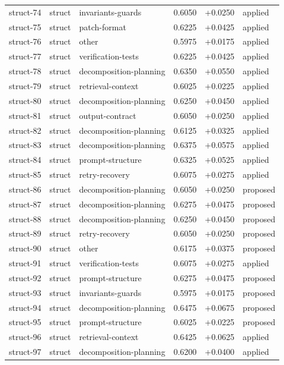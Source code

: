 \begin{center}
\begin{longtable}{llp{5.2cm}rrl}
struct-74 & struct & invariants-guards & 0.6050 & +0.0250 & applied \\
struct-75 & struct & patch-format & 0.6225 & +0.0425 & applied \\
struct-76 & struct & other & 0.5975 & +0.0175 & applied \\
struct-77 & struct & verification-tests & 0.6225 & +0.0425 & applied \\
struct-78 & struct & decomposition-planning & 0.6350 & +0.0550 & applied \\
struct-79 & struct & retrieval-context & 0.6025 & +0.0225 & applied \\
struct-80 & struct & decomposition-planning & 0.6250 & +0.0450 & applied \\
struct-81 & struct & output-contract & 0.6050 & +0.0250 & applied \\
struct-82 & struct & decomposition-planning & 0.6125 & +0.0325 & applied \\
struct-83 & struct & decomposition-planning & 0.6375 & +0.0575 & applied \\
struct-84 & struct & prompt-structure & 0.6325 & +0.0525 & applied \\
struct-85 & struct & retry-recovery & 0.6075 & +0.0275 & applied \\
struct-86 & struct & decomposition-planning & 0.6050 & +0.0250 & proposed \\
struct-87 & struct & decomposition-planning & 0.6275 & +0.0475 & proposed \\
struct-88 & struct & decomposition-planning & 0.6250 & +0.0450 & proposed \\
struct-89 & struct & retry-recovery & 0.6050 & +0.0250 & proposed \\
struct-90 & struct & other & 0.6175 & +0.0375 & proposed \\
struct-91 & struct & verification-tests & 0.6075 & +0.0275 & applied \\
struct-92 & struct & prompt-structure & 0.6275 & +0.0475 & proposed \\
struct-93 & struct & invariants-guards & 0.5975 & +0.0175 & proposed \\
struct-94 & struct & decomposition-planning & 0.6475 & +0.0675 & proposed \\
struct-95 & struct & prompt-structure & 0.6025 & +0.0225 & proposed \\
struct-96 & struct & retrieval-context & 0.6425 & +0.0625 & applied \\
struct-97 & struct & decomposition-planning & 0.6200 & +0.0400 & applied \\

\end{longtable}
\end{center}
